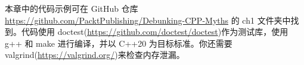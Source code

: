 本章中的代码示例可在 GitHub 仓库 \url{https://github.com/PacktPublishing/Debunking-CPP-Myths} 的 ch1 文件夹中找到。代码使用 doctest(\url{https://github.com/doctest/doctest})作为测试库，使用 g++ 和 make 进行编译，并以 C++20 为目标标准。你还需要 valgrind(\url{https://valgrind.org/})来检查内存泄漏。